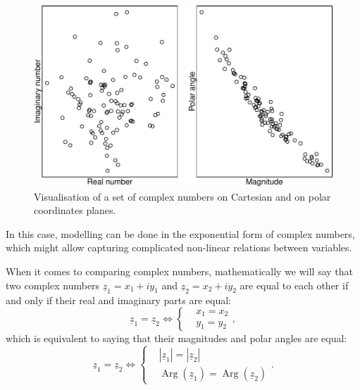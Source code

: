 \documentclass[
]{book}
\DeclareMathOperator\Arg{Arg}
\begin{document}
\begin{figure}
\centering
\includegraphics{Svetunkov---Svetunkov---Complex-Valued-Econometrics_files/figure-latex/complexCartesianvsPolar-1.pdf}
\caption{\label{fig:complexCartesianvsPolar}Visualisation of a set of complex numbers on Cartesian and on polar coordinates planes.}
\end{figure}

In this case, modelling can be done in the exponential form of complex numbers, which might allow capturing complicated non-linear relations between variables.

When it comes to comparing complex numbers, mathematically we will say that two complex numbers \(\underline{z}_1 = x_1 + i y_1\) and \(\underline{z}_2 = x_2 + i y_2\) are equal to each other if and only if their real and imaginary parts are equal:
\begin{equation*}
    \underline{z}_1 = \underline{z}_2 \iff \left \lbrace
    \begin{aligned}
        & x_1 = x_2 \\
        & y_1 = y_2
    \end{aligned}
    \right. ,
\end{equation*}
which is equivalent to saying that their magnitudes and polar angles are equal:
\begin{equation*}
    \underline{z}_1 = \underline{z}_2 \iff \left \lbrace
    \begin{aligned}
        & |\underline{z}_1| = |\underline{z}_2| \\
        & \Arg(\underline{z}_1) = \Arg(\underline{z}_2)
    \end{aligned}
    \right. .
\end{equation*}
\end{document}
